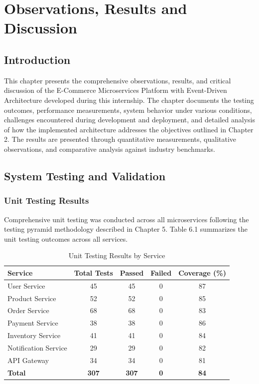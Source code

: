 \chapter{Observations, Results and Discussion}

\section{Introduction}

This chapter presents the comprehensive observations, results, and critical discussion of the E-Commerce Microservices Platform with Event-Driven Architecture developed during this internship. The chapter documents the testing outcomes, performance measurements, system behavior under various conditions, challenges encountered during development and deployment, and detailed analysis of how the implemented architecture addresses the objectives outlined in Chapter 2. The results are presented through quantitative measurements, qualitative observations, and comparative analysis against industry benchmarks.

\section{System Testing and Validation}

\subsection{Unit Testing Results}

Comprehensive unit testing was conducted across all microservices following the testing pyramid methodology described in Chapter 5. Table 6.1 summarizes the unit testing outcomes across all services.

\begin{table}[h]
\centering
\caption{Unit Testing Results by Service}
\begin{tabular}{|l|c|c|c|c|}
\hline
\textbf{Service} & \textbf{Total Tests} & \textbf{Passed} & \textbf{Failed} & \textbf{Coverage (\%)} \\
\hline
User Service & 45 & 45 & 0 & 87 \\
Product Service & 52 & 52 & 0 & 85 \\
Order Service & 68 & 68 & 0 & 83 \\
Payment Service & 38 & 38 & 0 & 86 \\
Inventory Service & 41 & 41 & 0 & 84 \\
Notification Service & 29 & 29 & 0 & 82 \\
API Gateway & 34 & 34 & 0 & 81 \\
\hline
\textbf{Total} & \textbf{307} & \textbf{307} & \textbf{0} & \textbf{84} \\
\hline
\end{tabular}
\end{table}

